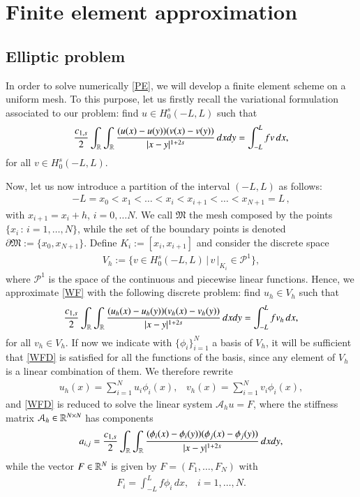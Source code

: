 \section{Finite element approximation}\label{fe_sec}

\subsection{Elliptic problem}

In order to solve numerically \eqref{PE}, we will develop a finite element scheme on a uniform mesh. To this purpose, let us firstly recall the variational formulation associated to our problem: find $u\in H_0^s(-L,L)$ such that
\begin{align}\label{WF}
	\frac{c_{1,s}}{2} \int_{\mathbb{R}}\int_{\mathbb{R}}\frac{(u(x)-u(y))(v(x)-v(y))}{|x-y|^{1+2s}}\,dxdy = \int_{-L}^L fv\,dx,	
\end{align}
for all $v\in H_0^s(-L,L)$. 

Now, let us now introduce a partition of the interval $(-L,L)$ as follows:
\begin{align*}
	-L = x_0<x_1<\ldots <x_i<x_{i+1}<\ldots<x_{N+1}=L\,,
\end{align*}
with $x_{i+1}=x_i+h$, $i=0,\ldots N$. We call $\mathfrak{M}$ the mesh composed by the points $\{x_i\,:\, i=1,\ldots,N\}$, while the set of the boundary points is denoted $\partial\mathfrak{M}:=\{x_0,x_{N+1}\}$. Define $K_i:=[x_i,x_{i+1}]$ and consider the discrete space 
\begin{align*}
	V_h :=\Big\{v\in H_0^s(-L,L)\,\big|\, \left. v\,\right|_{K_i}\in \mathcal{P}^1\Big\},
\end{align*} 
where $\mathcal{P}^1$ is the space of the continuous and piecewise linear functions. Hence, we approximate \eqref{WF} with the following discrete problem: find $u_h\in V_h$ such that
\begin{align}\label{WFD}
	\frac{c_{1,s}}{2} \int_{\mathbb{R}}\int_{\mathbb{R}}\frac{(u_h(x)-u_h(y))(v_h(x)-v_h(y))}{|x-y|^{1+2s}}\,dxdy = \int_{-L}^L fv_h\,dx,	
\end{align}
for all $v_h\in V_h$. If now we indicate with $\big\{\phi_i\big\}_{i=1}^N$ a basis of $V_h$, it will be sufficient that \eqref{WFD} is satisfied for all the functions of the basis, since any element of $V_h$ is a linear combination of them. We therefore rewrite 
\begin{align*}
	u_h(x) = \sum_{i=1}^N u_i\phi_i(x),\;\;\; v_h(x) = \sum_{i=1}^N v_i\phi_i(x),
\end{align*} 
and \eqref{WFD} is reduced to solve the linear system $\mathcal A_h u=F$, where the stiffness matrix $\mathcal A_h\in \mathbb{R}^{N\times N}$ has components
\begin{align}\label{stiffness}
	a_{i,j}=\frac{c_{1,s}}{2} \int_{\mathbb{R}}\int_{\mathbb{R}}\frac{(\phi_i(x)-\phi_i(y))(\phi_j(x)-\phi_j(y))}{|x-y|^{1+2s}}\,dxdy,	
\end{align}
while the vector $F\in\mathbb{R}^N$ is given by $F=(F_1,\ldots,F_N)$ with
\begin{align*}
	F_i = \int_{-L}^L f\phi_i\,dx,\;\;\; i=1,\ldots,N.
\end{align*}

